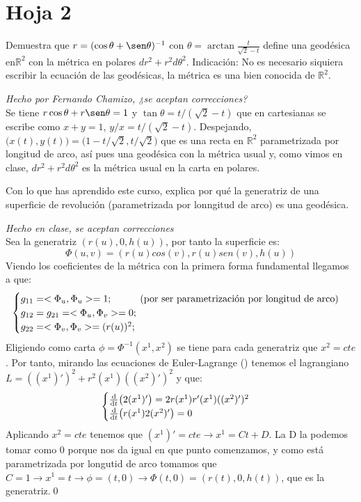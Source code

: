 \section{Hoja 2}
\begin{problem}[10] Demuestra que 
	$r=(\cos\theta+\sen\theta)^{-1}$ con $\theta=\arctan \frac{t}{\sqrt{2}-t}$ define una geodésica en$ℝ^2$ con la métrica en polares $dr^2+r^2d\theta^2$.
	{\sf Indicación:} No es necesario siquiera escribir la ecuación de las geodésicas, la métrica es una bien conocida de $ℝ^2$. 
	
	\solution\textit{Hecho por Fernando Chamizo, ¿se aceptan correcciones?}\\ Se tiene $r\cos\theta+r\sen\theta=1$ y $\tan\theta= {t}/({\sqrt{2}-t})$ que en cartesianas se escribe como $x+y=1$, ${y}/x={t}/({\sqrt{2}-t})$. Despejando, $\big(x(t),y(t)\big)=\big(1-t/\sqrt{2},t/\sqrt{2}\big)$ que es  una recta en $ℝ^2$ parametrizada por longitud de arco, así pues una geodésica con la métrica usual y, como vimos en clase, $dr^2+r^2d\theta^2$ es la métrica usual en la carta en polares. 
\end{problem}
\begin{problem}[11] Con lo que has aprendido este curso, explica por qué la generatriz de una superficie de revolución (parametrizada por lonngitud de arco) es una geodésica.
	
	\solution\textit{Hecho en clase, se aceptan correcciones}\\ Sea la generatriz $(r(u),0,h(u))$, por tanto la superficie es: $$\Phi(u,v)=(r(u)cos(v),r(u)sen(v),h(u))$$ Viendo los coeficientes de la métrica con la primera forma fundamental llegamos a que: $$\begin{cases}g_{11}=<\Phi_u,\Phi_u>=1;\hspace*{1cm}\text{(por ser parametrización por longitud de arco)}\\g_{12}=g_{21}=<\Phi_u,\Phi_v>=0;\\g_{22}=<\Phi_v,\Phi_v>=(r(u))^2;\end{cases}$$ Eligiendo como carta $\phi=\Phi^{-1}(x^1,x^2)$ se tiene para cada generatriz que $x^2=cte$. Por tanto, mirando las ecuaciones de Euler-Lagrange () tenemos el lagrangiano $L=((x^1)')^2+r^2(x^1)((x^2)')^2$ y que:
	$$\begin{cases}\dv{t}(2(x^1)')=2r(x^1)r'(x^1)((x^2)')^2\\\dv{t}(r(x^1)2(x^2)')=0\end{cases}$$ Aplicando $x^2=cte$ tenemos que $(x^1)'=cte\longrightarrow x^1=Ct+D$. La D la podemos tomar como 0 porque nos da igual en que punto comenzamos, y como está parametrizada por longutid de arco tomamos que $C=1\longrightarrow x^1=t\longrightarrow\phi=(t,0)\longrightarrow\Phi(t,0)=(r(t),0,h(t))$, que es la generatriz.\qed
\end{problem}


